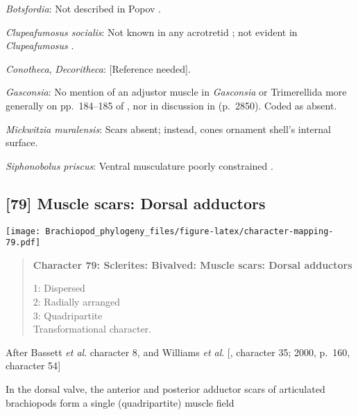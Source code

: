\documentclass[openany]{book}
\theoremstyle{definition}
\theoremstyle{definition}
\theoremstyle{definition}
\theoremstyle{remark}
\begin{document}
\hypertarget{Botsfordia-coding-78}{}
\emph{Botsfordia}: Not described in Popov
\citeyearpar{Popov1992TheCambrian}.

\hypertarget{Clupeafumosus_socialis-coding-78}{}
\emph{Clupeafumosus socialis}: Not known in any acrotretid
\citep{Williams2000LinguliformeaCraniiformea}; not evident in
\emph{Clupeafumosus} \citep{Topper2013Reappraisalof}.

\hypertarget{Conotheca-coding-78}{}
\emph{Conotheca}, \emph{Decoritheca}: {[}Reference needed{]}.

\hypertarget{Gasconsia-coding-78}{}
\emph{Gasconsia}: No mention of an adjustor muscle in \emph{Gasconsia}
or Trimerellida more generally on pp.~184--185 of
\citet{Williams2000LinguliformeaCraniiformea}, nor in discussion in
\citet{Williams2007Supplement} (p.~2850). Coded as absent.

\hypertarget{Mickwitzia_muralensis-coding-78}{}
\emph{Mickwitzia muralensis}: Scars absent; instead, cones ornament
shell's internal surface.

\hypertarget{Siphonobolus_priscus-coding-78}{}
\emph{Siphonobolus priscus}: Ventral musculature poorly constrained
\citep{Williams2000LinguliformeaCraniiformea, Popov2009Earlyontogeny}.

\subsection*{{[}79{]} Muscle scars: Dorsal
adductors}\label{muscle-scars-dorsal-adductors}

\texttt{[image: Brachiopod\_phylogeny\_files/figure-latex/character-mapping-79.pdf]}

\begin{quote}
\textbf{Character 79: Sclerites: Bivalved: Muscle scars: Dorsal
adductors}

1: Dispersed\\
2: Radially arranged\\
3: Quadripartite\\
Transformational character.
\end{quote}

After Bassett \emph{et al}.
\citeyearpar{Bassett2001Functionalmorphology} character 8, and Williams
\emph{et al}. {[}\citet{Williams1996Asupra}, character 35; 2000, p.~160,
character 54{]}

In the dorsal valve, the anterior and posterior adductor scars of
articulated brachiopods form a single (quadripartite) muscle field
\citep[p.~201]{Williams2000LinguliformeaCraniiformea}
\end{document}
